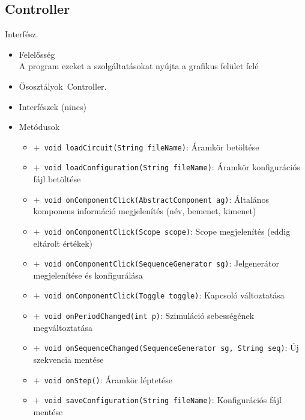 \subsection{Controller}
Interfész.
\begin{itemize}
\item Felelősség\\
A program ezeket a szolgáltatásokat nyújta a grafikus felület felé
\item Ősosztályok\ Controller.
\item Interfészek (nincs)
\item Metódusok$\ $
\begin{itemize}
	\item[] \texttt{$+$ void loadCircuit(String fileName)}: Áramkör betöltése
	\item[] \texttt{$+$ void loadConfiguration(String fileName)}: Áramkör konfigurációs fájl betöltése
	\item[] \texttt{$+$ void onComponentClick(AbstractComponent ag)}: Általános komponens információ megjelenítés (név, bemenet, kimenet)
	\item[] \texttt{$+$ void onComponentClick(Scope scope)}: Scope megjelenítés (eddig eltárolt értékek)
	\item[] \texttt{$+$ void onComponentClick(SequenceGenerator sg)}: Jelgenerátor megjelenítése és konfigurálása
	\item[] \texttt{$+$ void onComponentClick(Toggle toggle)}: Kapcsoló változtatása
	\item[] \texttt{$+$ void onPeriodChanged(int p)}: Szimuláció sebességének megváltoztatása
	\item[] \texttt{$+$ void onSequenceChanged(SequenceGenerator sg, String seq)}: Új szekvencia mentése
	\item[] \texttt{$+$ void onStep()}: Áramkör léptetése
	\item[] \texttt{$+$ void saveConfiguration(String fileName)}: Konfigurációs fájl mentése
\end{itemize}
\end{itemize}

